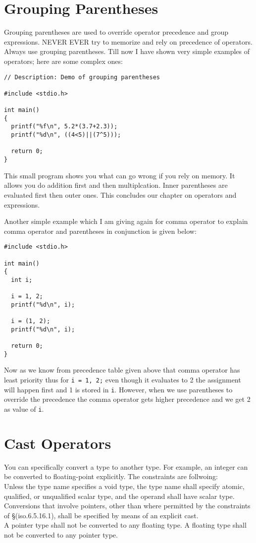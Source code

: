 \section{Grouping Parentheses}
Grouping parentheses are used to override operator precedence and group
expressions. NEVER EVER try to memorize and rely on precedence of
operators. Always use grouping parentheses. Till now I have shown very simple
examples of operators; here are some complex ones:

\begin{verbatim}
// Description: Demo of grouping parentheses

#include <stdio.h>

int main()
{
  printf("%f\n", 5.2*(3.7+2.3));
  printf("%d\n", ((4<5)||(7^5)));

  return 0;
}
\end{verbatim}

This small program shows you what can go wrong if you rely on memory. It allows
you do addition first and then multiplcation. Inner parentheses are evaluated
first then outer ones. This concludes our chapter on operators and
expressions.

Another simple example which I am giving again for comma operator to
explain comma operator and parentheses in conjunction is given below:

\begin{verbatim}
#include <stdio.h>

int main()
{
  int i;

  i = 1, 2;
  printf("%d\n", i);

  i = (1, 2);
  printf("%d\n", i);

  return 0;
}
\end{verbatim}

Now as we know from precedence table given above that comma operator has least
priority thus for \texttt{i = 1, 2;} even though it evaluates to 2 the
assignment will happen first and 1 is stored in \texttt{i}. However, when we
use parentheses to override the precedence the comma operator gets higher
precedence and we get 2 as value of \texttt{i}.

\section{Cast Operators}
You can specifically convert a type to another type. For example, an integer
can be converted to floating-point explicitly. The constraints are follwoing:\\
Unless the type name specifies a void type, the type name shall specify atomic,
qualified, or unqualified scalar type, and the operand shall have scalar
type.\\
Conversions that involve pointers, other than where permitted by the
constraints of \S(iso.6.5.16.1), shall be specified by means of an explicit
cast.\\
A pointer type shall not be converted to any floating type. A floating type
shall not be converted to any pointer type.


